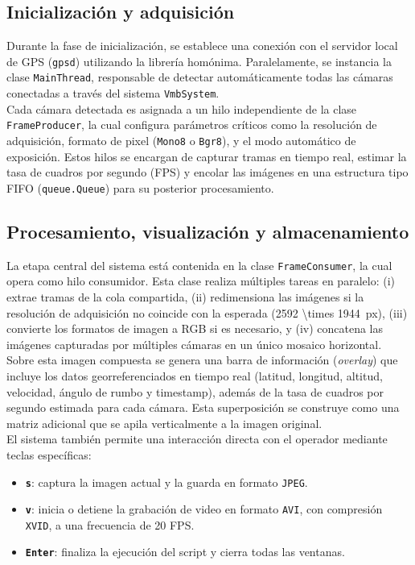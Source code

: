     \subsection{Inicialización y adquisición}
    
    Durante la fase de inicialización, se establece una conexión con el servidor local de GPS (\texttt{gpsd}) utilizando la librería homónima. Paralelamente, se instancia la clase \texttt{MainThread}, responsable de detectar automáticamente todas las cámaras conectadas a través del sistema \texttt{VmbSystem}.\\
    
     Cada cámara detectada es asignada a un hilo independiente de la clase \texttt{FrameProducer}, la cual configura parámetros críticos como la resolución de adquisición, formato de pixel (\texttt{Mono8} o \texttt{Bgr8}), y el modo automático de exposición. Estos hilos se encargan de capturar tramas en tiempo real, estimar la tasa de cuadros por segundo (FPS) y encolar las imágenes en una estructura tipo FIFO (\texttt{queue.Queue}) para su posterior procesamiento.
    
    \subsection{Procesamiento, visualización y almacenamiento}
    
    La etapa central del sistema está contenida en la clase \texttt{FrameConsumer}, la cual opera como hilo consumidor. Esta clase realiza múltiples tareas en paralelo: (i) extrae tramas de la cola compartida, (ii) redimensiona las imágenes si la resolución de adquisición no coincide con la esperada (\SI[parse-numbers = false]{2592 \times 1944}{px}), (iii) convierte los formatos de imagen a RGB si es necesario, y (iv) concatena las imágenes capturadas por múltiples cámaras en un único mosaico horizontal.\\
    
    Sobre esta imagen compuesta se genera una barra de información (\textit{overlay}) que incluye los datos georreferenciados en tiempo real (latitud, longitud, altitud, velocidad, ángulo de rumbo y timestamp), además de la tasa de cuadros por segundo estimada para cada cámara. Esta superposición se construye como una matriz adicional que se apila verticalmente a la imagen original.\\
    
    El sistema también permite una interacción directa con el operador mediante teclas específicas:
    \begin{itemize}
        \item \textbf{\texttt{s}}: captura la imagen actual y la guarda en formato \texttt{JPEG}.
        \item \textbf{\texttt{v}}: inicia o detiene la grabación de video en formato \texttt{AVI}, con compresión \texttt{XVID}, a una frecuencia de 20 FPS.
        \item \textbf{\texttt{Enter}}: finaliza la ejecución del script y cierra todas las ventanas.
    \end{itemize}
    
